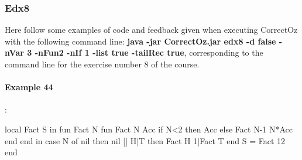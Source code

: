 \documentclass[11pt,a4paper,twoside,openright]{report}
\begin{document}
\subsubsection{Edx8}
Here follow some examples of code and feedback given when executing 
CorrectOz with the following command line: \textbf{java -jar CorrectOz.jar edx8 -d 
false -nVar 3 -nFun2 -nIf 1 -list true -tailRec true}, 
corresponding to the command line for the exercise number 8 of the course.

%
%
%
%



\paragraph{Example 44}:

\begin{OZ}
local Fact S in 
	fun {Fact N}
		fun {Fact N Acc}
		      if N<2 then Acc
		      else {Fact N-1 N*Acc} end
		 end
		in
			case N of nil then nil
				   [] H|T then {Fact H 1}|{Fact T}
			 end
	S = {Fact 12}
end
\end{OZ}
\end{document}
